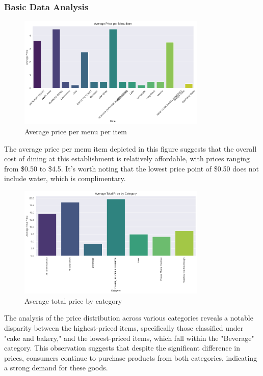 \subsubsection{Basic Data Analysis}

\begin{figure}[H]
	\centering
	\includegraphics[width=0.8\textwidth]{assets/basic/average price per menu per item.png}
	\caption{Average price per menu per item}
	\label{fig:average_price_per_menu_per_item}
\end{figure}

The average price per menu item depicted in this figure suggests that the overall cost of dining at this establishment is relatively affordable, with prices ranging from \$0.50 to \$4.5. It's worth noting that the lowest price point of \$0.50 does not include water, which is complimentary.

\begin{figure}[H]
	\centering
	\includegraphics[width=0.8\textwidth]{assets/basic/average total price by category.png}
	\caption{Average total price by category}
	\label{fig:average_total_price_by_category}
\end{figure}

The analysis of the price distribution across various categories reveals a notable disparity between the highest-priced items, specifically those classified under "cake and bakery," and the lowest-priced items, which fall within the "Beverage" category. This observation suggests that despite the significant difference in prices, consumers continue to purchase products from both categories, indicating a strong demand for these goods.

